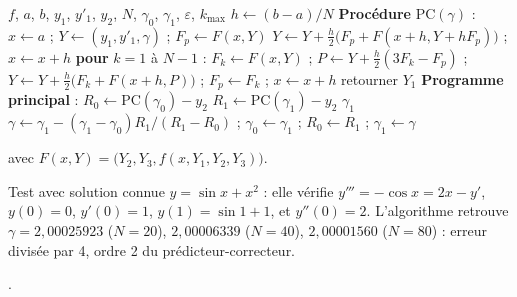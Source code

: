 \begin{algo}[ : tir + prédicteur-correcteur pour $y''' = f(x, y, y', y'')$]
  \Require $f$, $a$, $b$, $y_1$, $y'_1$, $y_2$, $N$, $\gamma_0$, $\gamma_1$, $\varepsilon$, $k_{\max}$
  \State $h \leftarrow (b-a)/N$
  \Statex \textbf{Procédure} $\mathrm{PC}(\gamma)$ :
  \State \quad $x \leftarrow a$ ; $Y \leftarrow (y_1, y'_1, \gamma)$ ; $F_p \leftarrow F(x, Y)$
  \State \quad $Y \leftarrow Y + \frac h2\bigl(F_p + F(x + h, Y + hF_p)\bigr)$ ; $x \leftarrow x + h$ 
  \State \quad \textbf{pour} $k = 1$ à $N-1$ : $F_k \leftarrow F(x, Y)$ ; $P \leftarrow Y + \frac h2(3F_k - F_p)$ ;
  \State \quad\quad $Y \leftarrow Y + \frac h2\bigl(F_k + F(x + h, P)\bigr)$ ; $F_p \leftarrow F_k$ ; $x \leftarrow x + h$
  \State \quad retourner $Y_1$ 
  \Statex \textbf{Programme principal} :
  \State $R_0 \leftarrow \mathrm{PC}(\gamma_0) - y_2$
    \State $R_1 \leftarrow \mathrm{PC}(\gamma_1) - y_2$
     \Print $\gamma_1$ \Stop \EndIf
    \State $\gamma \leftarrow \gamma_1 - (\gamma_1 - \gamma_0)R_1/(R_1 - R_0)$ ;
           $\gamma_0 \leftarrow \gamma_1$ ; $R_0 \leftarrow R_1$ ; $\gamma_1 \leftarrow \gamma$
  \EndFor
\end{algo}
avec $F(x, Y) = \bigl(Y_2, Y_3, f(x, Y_1, Y_2, Y_3)\bigr)$.

\Verif Test avec solution connue $y = \sin x + x^2$ : elle vérifie
$y''' = -\cos x = 2x - y'$, $y(0) = 0$, $y'(0) = 1$, $y(1) = \sin 1 + 1$, et
$y''(0) = 2$. L'algorithme retrouve $\gamma = 2{,}00025923$ ($N = 20$),
$2{,}00006339$ ($N = 40$), $2{,}00001560$ ($N = 80$) : erreur divisée par 4,
ordre 2 du prédicteur-correcteur.

\Refs {}.
